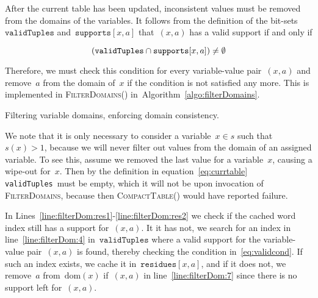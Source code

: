 \documentclass[a4paper,11pt]{article}
\newcommand{\Algoref}[1]{Algorithm~\ref{#1}}
\newcommand{\Lineref}[1]{Line~\ref{#1}}
\newcommand{\Linesref}[2]{Lines~\ref{#1}-\ref{#2}}
\newcommand{\Dom}[1]{\text{dom}({#1})}
\newcommand{\Scp}{\texttt{vars}}
\newcommand{\CurrTable}{\texttt{validTuples}}
\newcommand{\Supports}{\texttt{supports}}
\newcommand{\Residues}{\texttt{residues}}
\def\CompactTable{\textsc{CompactTable}}
\def\FilterDomains{\textsc{FilterDomains}}
\numberwithin{equation}{section}
\begin{document}
  After the current table has been updated, inconsistent values must be removed
  from the domains of the variables.   
  It follows from the definition of the bit-sets~$\CurrTable$ and~$\Supports[x,a]$
  that~$(x,a)$ has a valid support if and only if 

  \begin{equation}
    \label{eq:validcond}
    (\CurrTable \Inter \Supports[x,a]) \neq \emptyset
  \end{equation}

  Therefore, we must check this condition for every variable-value pair~$(x,a)$ and
  remove~$a$ from the domain of~$x$ if the condition is not satisfied any more.
  This is implemented in \FilterDomains()
  in~\Algoref{algo:filterDomains}.%

  \begin{algorithm}[H]
    \begin{algorithmic}[1]  %
      
    \end{algorithmic}
    \caption{Filtering variable domains, enforcing domain consistency.}
        \label{algo:filterDomains}
  \end{algorithm}

  
  We note that it is only necessary to
  consider a variable~$x \in s$ such that~$s(x) > 1$,
  because we will never filter out values from the domain of an assigned
  variable. To see this, assume we removed the last value for a variable~$x$,
  causing a wipe-out for~$x$. Then by the definition in equation~\eqref{eq:currtable}
  \CurrTable~must be empty,
  which it will not be upon invocation of \FilterDomains, because then
  \CompactTable() would have reported failure. 

  In \Linesref{line:filterDom:res1}{line:filterDom:res2} we check if the
  cached word index still has a support for~$(x,a)$. It it has not,
  we search for an index in line~\ref{line:filterDom:4} in~$\CurrTable$
  where a valid support for the variable-value pair~$(x,a)$ is found, 
  thereby checking the condition in~\eqref{eq:validcond}.
  If such an index exists, we cache it in~$\Residues[x,a]$, and
  if it does not, we remove~$a$ from~$\Dom{x}$ if~$(x,a)$ in 
  line~\ref{line:filterDom:7} since there is no support left for~$(x,a)$.
\end{document}

